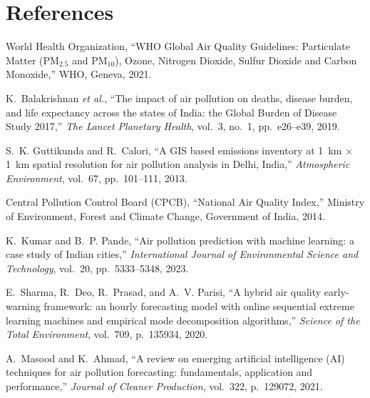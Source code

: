 \documentclass[12pt,a4paper]{report}
\begin{document}
\clearpage
\chapter{References}\label{idx:ch10}

\begin{enumerate}[leftmargin=1.5cm, label={[\arabic*]}]

\item World Health Organization, ``WHO Global Air Quality Guidelines: Particulate Matter (PM$_{2.5}$ and PM$_{10}$), Ozone, Nitrogen Dioxide, Sulfur Dioxide and Carbon Monoxide,'' WHO, Geneva, 2021.

\item K.~Balakrishnan \textit{et al.}, ``The impact of air pollution on deaths, disease burden, and life expectancy across the states of India: the Global Burden of Disease Study 2017,'' \textit{The Lancet Planetary Health}, vol.~3, no.~1, pp.~e26--e39, 2019.

\item S.~K. Guttikunda and R.~Calori, ``A GIS based emissions inventory at 1~km $\times$ 1~km spatial resolution for air pollution analysis in Delhi, India,'' \textit{Atmospheric Environment}, vol.~67, pp.~101--111, 2013.

\item Central Pollution Control Board (CPCB), ``National Air Quality Index,'' Ministry of Environment, Forest and Climate Change, Government of India, 2014.

\item K.~Kumar and B.~P. Pande, ``Air pollution prediction with machine learning: a case study of Indian cities,'' \textit{International Journal of Environmental Science and Technology}, vol.~20, pp.~5333--5348, 2023.

\item E.~Sharma, R.~Deo, R.~Prasad, and A.~V. Parisi, ``A hybrid air quality early-warning framework: an hourly forecasting model with online sequential extreme learning machines and empirical mode decomposition algorithms,'' \textit{Science of the Total Environment}, vol.~709, p.~135934, 2020.

\item A.~Masood and K.~Ahmad, ``A review on emerging artificial intelligence (AI) techniques for air pollution forecasting: fundamentals, application and performance,'' \textit{Journal of Cleaner Production}, vol.~322, p.~129072, 2021.


\end{enumerate}
\end{document}
